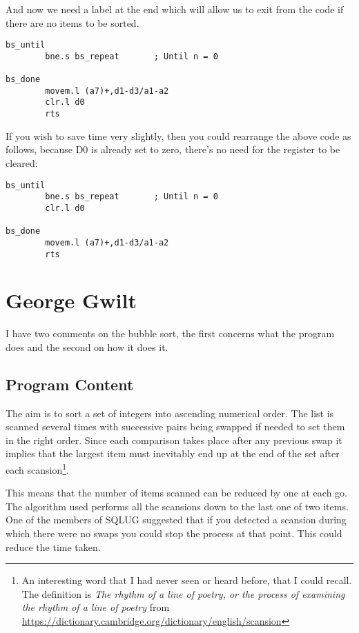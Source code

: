 And now we need a label  at the end which will allow us to exit from the code if there are no items to be sorted.

\begin{lstlisting}[firstnumber=96,caption={Better Bubblesort - Bug Fix 1b}]
bs_until
        bne.s bs_repeat       ; Until n = 0

bs_done
        movem.l (a7)+,d1-d3/a1-a2
        clr.l d0
        rts
\end{lstlisting}

If you wish to save time very slightly, then you could rearrange the above code as follows, because D0 is already set to zero, there's no need for the register to be cleared:

\begin{lstlisting}[firstnumber=96,caption={Better Bubblesort - Better Bug Fix 1b}]
bs_until
        bne.s bs_repeat       ; Until n = 0
        clr.l d0

bs_done
        movem.l (a7)+,d1-d3/a1-a2
        rts
\end{lstlisting}


\section {George Gwilt}

I have two comments on the bubble sort, the first concerns what the program
does and the second on how it does it.


\subsection{Program Content}

The aim is to sort a set of integers into ascending numerical order. The list is scanned several times with successive pairs being swapped if needed to set them in the right order. Since each comparison takes place after any previous swap it implies that the largest item must inevitably end up at the end of the set after each scansion\footnote{An interesting word that I had never seen or heard before, that I could recall. The definition is \emph{The rhythm of a line of poetry, or the process of examining the rhythm of a line of poetry} from \url{https://dictionary.cambridge.org/dictionary/english/scansion}}. 

This means that the number of items scanned can be reduced by one at each go. The algorithm used performs all the scansions down to the last one of two items. One of the members of SQLUG suggested that if you detected a scansion during which there were no swaps you could stop the process at that point. This could reduce the time taken.

